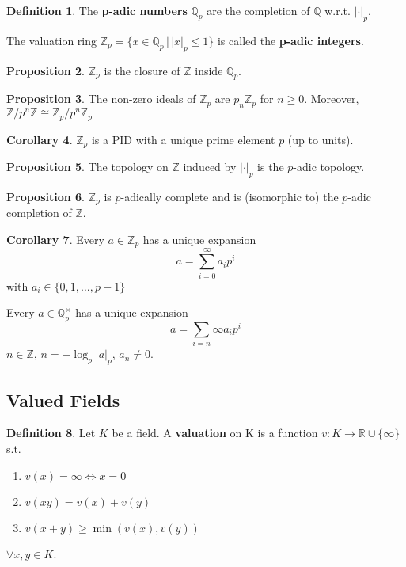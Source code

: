 \documentclass[a4paper]{article}
\theoremstyle{definition}
\newtheorem{definition}{Definition}
\theoremstyle{default}
\newtheorem{prop}[definition]{Proposition}
\newtheorem{corollary}[definition]{Corollary}
\theoremstyle{remark}
\newcommand*\abs[1]{\left|#1\right|}
\begin{document}
\begin{definition}
	The \textbf{p-adic numbers} $\mathbb{Q}_p$ are the completion of $\mathbb{Q}$ w.r.t. $\abs{\cdot}_p$.
	
	The valuation ring $\mathbb{Z}_p = \{x \in \mathbb{Q}_p \,|\, \abs{x}_p \leq 1 \}$ is called the \textbf{p-adic integers}.
\end{definition}

\begin{prop}
	$\mathbb{Z}_p$ is the closure of $\mathbb{Z}$ inside $\mathbb{Q}_p$.
\end{prop}

\begin{prop}
	The non-zero ideals of $\mathbb{Z}_p$ are $p_n\mathbb{Z}_p$ for $n \geq 0$.
	Moreover, $\mathbb{Z}/p^n\mathbb{Z} \cong \mathbb{Z}_p/p^n\mathbb{Z}_p$
\end{prop}

\begin{corollary}
	$\mathbb{Z}_p$ is a PID with a unique prime element $p$ (up to units).
\end{corollary}

\begin{prop}
	The topology on $\mathbb{Z}$ induced by $\abs{\cdot}_p$ is the $p$-adic topology.
\end{prop}

\begin{prop}
	$\mathbb{Z}_p$ is $p$-adically complete and is (isomorphic to) the $p$-adic completion of $\mathbb{Z}$.
\end{prop}

\begin{corollary}
	Every $a \in \mathbb{Z}_p$ has a unique expansion $$a = \sum_{i=0}^\infty a_ip^i$$ with $a_i \in \{0, 1, \dots, p-1\}$
	
	Every $a \in \mathbb{Q}_p^\times$ has a unique expansion $$a = \sum_{i=n}{\infty}a_ip^i$$ $n \in \mathbb{Z}$, $n = -\log_p\abs{a}_p$, $a_n \neq 0$.
\end{corollary}

\subsection{Valued Fields}
\begin{definition}
	Let $K$ be a field. A \textbf{valuation} on K is a function $v : K \to \mathbb{R} \cup \{\infty\}$ s.t.
	\begin{enumerate}[label=\roman*.]
		\item $v(x) = \infty \iff x = 0$
		\item $v(xy) = v(x)+v(y)$
		\item $v(x+y) \geq \min(v(x), v(y))$
	\end{enumerate}
	$\forall x, y \in K$.
\end{definition}
\end{document}

